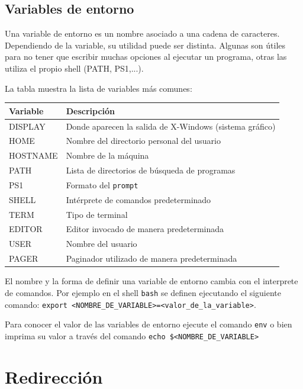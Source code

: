 \documentclass[12pt]{article}
\begin{document}
\subsection{Variables de entorno}

Una variable de entorno es un nombre asociado a una cadena de caracteres. Dependiendo de la variable, su utilidad puede ser distinta. 
Algunas son útiles para no tener que escribir muchas opciones al ejecutar un programa, otras las utiliza el propio shell (PATH, PS1,...). 

La tabla muestra la lista de variables más comunes:

\begin{center}
\begin{tabular}{|l|l|}\hline
\rowcolor{tcA}
Variable & Descripción \\\hline
DISPLAY & Donde aparecen la salida de X-Windows (sistema gráfico)\\\hline
HOME & Nombre del directorio personal del usuario\\\hline
HOSTNAME & Nombre de la máquina\\\hline
PATH & Lista de directorios de búsqueda de programas\\\hline
PS1 & Formato del \texttt{prompt}\\\hline
SHELL & Intérprete de comandos predeterminado\\\hline
TERM & Tipo de terminal\\\hline
EDITOR & Editor invocado de manera predeterminada\\\hline
USER & Nombre del usuario\\\hline
PAGER & Paginador utilizado de manera predeterminada\\\hline
\end{tabular}
\end{center}

El nombre y la forma de definir una variable de entorno cambia con el interprete de comandos.
Por ejemplo en el shell \texttt{bash} se definen ejecutando el siguiente comando: \texttt{export \textless NOMBRE\_DE\_VARIABLE\textgreater=\textless valor\_de\_la\_variable\textgreater}.

Para conocer el valor de las variables de entorno ejecute el comando \texttt{env} o bien imprima su valor
a través del comando \texttt{echo \$\textless NOMBRE\_DE\_VARIABLE\textgreater}

\section{Redirección}
\end{document}
